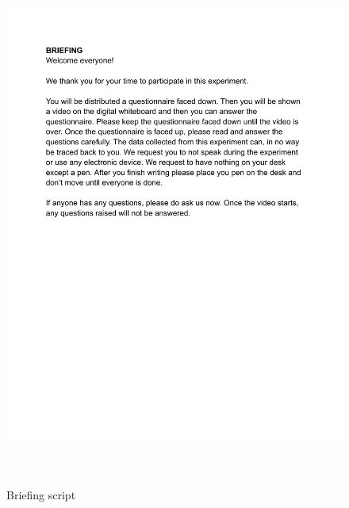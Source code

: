 \documentclass[11pt]{article}
\begin{document}
\begin{figure}[H]
  \caption{ ~\\Briefing script} 
  \centering 
  \includegraphics[width=\textwidth]{Briefing.pdf}
~\label{fig:briefing}
\end{figure} 
\end{document}
